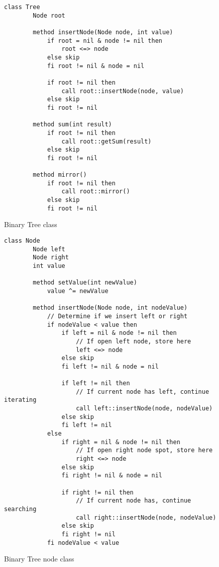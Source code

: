 \begin{figure}[ht!]
    \centering
    \begin{lstlisting}[style = basic, language = roopl] 
    class Tree
        Node root
        
        method insertNode(Node node, int value)
            if root = nil & node != nil then
                root <=> node
            else skip
            fi root != nil & node = nil
    
            if root != nil then
                call root::insertNode(node, value)
            else skip
            fi root != nil
    
        method sum(int result)
            if root != nil then
                call root::getSum(result)
            else skip
            fi root != nil
    
        method mirror()
            if root != nil then
                call root::mirror()
            else skip
            fi root != nil
    \end{lstlisting}
    \caption{Binary Tree class}
    \label{fig:binary-tree-class}
\end{figure}

\begin{figure}[ht!]
    \centering
    \begin{lstlisting}[style = basic, language = roopl] 
    class Node
        Node left
        Node right
        int value
    
        method setValue(int newValue)
            value ^= newValue 
    
        method insertNode(Node node, int nodeValue)
            // Determine if we insert left or right
            if nodeValue < value then
                if left = nil & node != nil then
                    // If open left node, store here
                    left <=> node
                else skip
                fi left != nil & node = nil
    
                if left != nil then
                    // If current node has left, continue iterating
                    call left::insertNode(node, nodeValue)
                else skip
                fi left != nil
            else
                if right = nil & node != nil then
                    // If open right node spot, store here
                    right <=> node
                else skip
                fi right != nil & node = nil
    
                if right != nil then
                    // If current node has, continue searching
                    call right::insertNode(node, nodeValue)
                else skip
                fi right != nil
            fi nodeValue < value
    \end{lstlisting}
    \caption{Binary Tree node class}
    \label{fig:binary-tree-node-class}
\end{figure}

